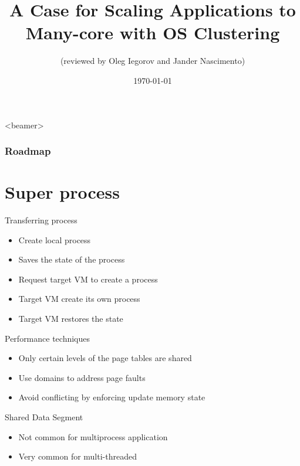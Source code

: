 \documentclass{beamer}
\title[A Case for Scaling Applications to Many-core with OS Clustering ]{A Case for Scaling Applications to Many-core with OS Clustering}
\author{
(reviewed by Oleg Iegorov and Jander Nascimento)}
\institute{University Joseph Fourier}
\date{\today}
\begin{document}
\begin{frame}
\titlepage
\end{frame}

{
  \begin{frame}<beamer>
    \frametitle{Roadmap}
    \tableofcontents%
  \end{frame}
}


\section{Super process}

	\begin{frame}{Transferring process}

	\begin{itemize}
	\item Create local process
	\item Saves the state of the process
	\item Request target VM to create a process
	\item Target VM create its own process
	\item Target VM restores the state
	\end{itemize}
	
	\end{frame}	
	
	\begin{frame}{Performance techniques}

	\begin{itemize}
	\item Only certain levels of the page tables are shared
	\item Use domains to address page faults
	\item Avoid conflicting by enforcing update memory state
	\end{itemize}
	
	\end{frame}
	
	\begin{frame}{Shared Data Segment}
	
	\begin{itemize}	
		\item Not common for multiprocess application
		\item Very common for multi-threaded
	\end{itemize}	
		
	\end{frame}
\end{document}
